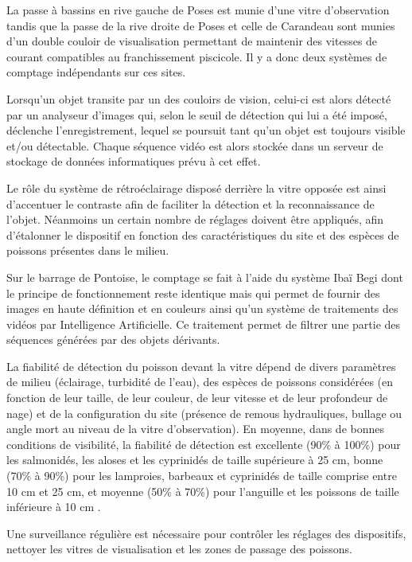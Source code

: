 \documentclass[11pt,twoside]{article}\usepackage[]{graphicx}\usepackage[table]{xcolor}
\begin{document}
La passe à bassins en rive gauche de Poses est munie d'une vitre d'observation tandis que la passe de la rive droite de Poses et celle de Carandeau sont munies d'un double couloir de visualisation permettant de maintenir des vitesses de courant compatibles au franchissement piscicole. Il y a donc deux systèmes de comptage indépendants sur ces sites.

Lorsqu'un objet transite par un des couloirs de vision, celui-ci est alors détecté par un analyseur d'images qui, selon le seuil de détection qui lui a été imposé, déclenche l'enregistrement, lequel se poursuit tant qu'un objet est toujours visible et/ou détectable. Chaque séquence vidéo est alors stockée dans un serveur de stockage de données informatiques prévu à cet effet.

Le rôle du système de rétroéclairage disposé derrière la vitre opposée est ainsi d'accentuer le contraste afin de faciliter la détection et la reconnaissance de l'objet. Néanmoins un certain nombre de réglages doivent être appliqués, afin d'étalonner le dispositif en fonction des caractéristiques du site et des espèces de poissons présentes dans le milieu.

Sur le barrage de Pontoise, le comptage se fait à l'aide du système Ibaï Begi dont le principe de fonctionnement reste identique mais qui permet de fournir des images en haute définition et en couleurs ainsi qu'un système de traitements des vidéos par Intelligence Artificielle. Ce traitement permet de filtrer une partie des séquences générées par des objets dérivants.

La fiabilité de détection du poisson devant la vitre dépend de divers paramètres de milieu (éclairage, turbidité de l'eau), des espèces de poissons considérées (en fonction de leur taille, de leur couleur, de leur vitesse et de leur profondeur de nage) et de la configuration du site (présence de remous hydrauliques, bullage ou angle mort au niveau de la vitre d'observation). En moyenne, dans de bonnes conditions de visibilité, la fiabilité de détection est excellente (90\% à 100\%) pour les salmonidés, les aloses et les cyprinidés de taille supérieure à 25 cm, bonne (70\% à 90\%) pour les lamproies, barbeaux et cyprinidés de taille comprise entre 10 cm et 25 cm, et moyenne (50\% à 70\%) pour l'anguille et les poissons de taille inférieure à 10 cm \citep{travade_les_1992}.

Une surveillance régulière est nécessaire pour contrôler les réglages des dispositifs, nettoyer les vitres de visualisation et les zones de passage des poissons.
\end{document}
